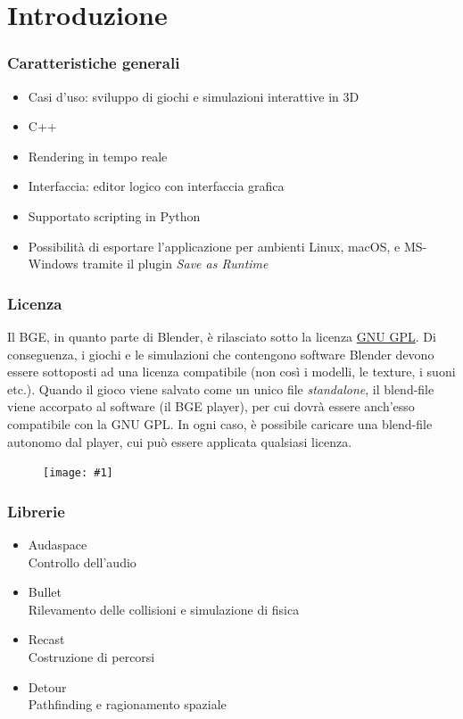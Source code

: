 \documentclass{beamer}
\def\image[#1][#2]{
	\begin{figure}[H]
		\centering
		\texttt{[image: \#1]}
\end{figure}}
\begin{document}
	\section{Introduzione}
		\begin{frame}
			\frametitle{Caratteristiche generali}
			\begin{itemize}
				\item Casi d'uso: sviluppo di giochi e simulazioni interattive in 3D 
				\item C++
				\item Rendering in tempo reale
				\item Interfaccia: editor logico con interfaccia grafica 
				\item Supportato scripting in Python
				\item Possibilità di esportare l'applicazione per ambienti Linux, macOS, e MS-Windows tramite il plugin \textit{Save as Runtime}
			\end{itemize}
		\end{frame}
		\begin{frame}
			\frametitle{Licenza}
			Il BGE, in quanto parte di Blender, è rilasciato sotto la licenza \hyperlink{https://www.gnu.org/licenses/gpl-3.0.en.html}{\textcolor{BlenderOrange}{GNU GPL}}. Di conseguenza, i giochi e le simulazioni che contengono software Blender devono essere sottoposti ad una licenza compatibile (non così i modelli, le texture, i suoni etc.).
			Quando il gioco viene salvato come un unico file \textit{standalone}, il blend-file viene accorpato al software (il BGE player), per cui dovrà essere anch'esso compatibile con la GNU GPL. In ogni caso, è possibile caricare una blend-file autonomo dal player, cui può essere applicata qualsiasi licenza.
			\image[images/gpl.png][scale=0.4]
		\end{frame}
		\begin{frame}
			\frametitle{Librerie}
			\begin{itemize}
				\item Audaspace \\ {\footnotesize\hspace{1em} Controllo dell'audio}
				\item Bullet \\ {\footnotesize\hspace{1em} Rilevamento delle collisioni e simulazione di fisica} 
				\item Recast \\ {\footnotesize\hspace{1em} Costruzione di percorsi}
				\item Detour \\ {\footnotesize\hspace{1em} Pathfinding e ragionamento spaziale}
			\end{itemize}
		\end{frame}
\end{document}
